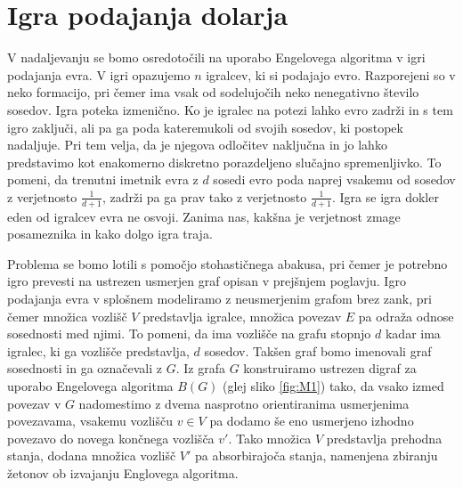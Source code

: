 \documentclass[twoside,11pt]{article}
\begin{document}
\section{Igra podajanja dolarja}
V nadaljevanju se bomo osredotočili na uporabo Engelovega algoritma v igri podajanja evra. V igri opazujemo $n$ 
igralcev, ki si podajajo evro. Razporejeni so v neko formacijo, pri čemer ima vsak od sodelujočih neko nenegativno število sosedov. Igra poteka izmenično. 
Ko je igralec na potezi lahko evro zadrži in s tem igro zaključi, ali pa ga poda kateremukoli od svojih sosedov, ki postopek nadaljuje. Pri tem velja, da je njegova odločitev naključna in jo lahko predstavimo kot enakomerno diskretno porazdeljeno slučajno spremenljivko. To pomeni, da trenutni imetnik evra z $d$ sosedi evro poda naprej vsakemu od sosedov
z verjetnosto $\frac{1}{d+1}$, zadrži pa ga prav tako z verjetnosto $\frac{1}{d+1}$. Igra se igra dokler eden od igralcev evra ne osvoji. Zanima nas, kakšna je verjetnost zmage posameznika in kako dolgo igra traja.

Problema se bomo lotili s pomočjo stohastičnega abakusa, pri čemer je potrebno igro prevesti na ustrezen usmerjen graf opisan v prejšnjem poglavju. Igro podajanja evra v splošnem modeliramo z neusmerjenim grafom brez zank, pri čemer množica vozlišč $V$ predstavlja igralce, množica povezav $E$ pa odraža odnose sosednosti med njimi.
To pomeni, da ima vozlišče na grafu stopnjo $d$ kadar ima igralec, ki ga vozlišče predstavlja, $d$ sosedov. Takšen graf bomo imenovali graf sosednosti in ga označevali z $G$. 
Iz grafa $G$ konstruiramo ustrezen digraf za uporabo Engelovega algoritma $B(G)$ (glej sliko \ref{fig:M1}) tako, da vsako izmed povezav v $G$ nadomestimo z dvema nasprotno orientiranima usmerjenima povezavama, vsakemu vozlišču $v\in V$ pa dodamo še eno usmerjeno izhodno povezavo do novega končnega vozlišča $v'$. 
Tako množica $V$ predstavlja prehodna stanja, dodana množica vozlišč $V'$ pa absorbirajoča stanja, namenjena zbiranju žetonov ob izvajanju Englovega algoritma. 
\end{document}
